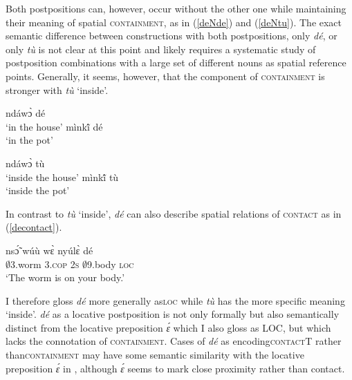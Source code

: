 Both postpositions can, however, occur without the other one while maintaining their meaning of spatial \textsc{containment}, as in (\ref{deNde}) and (\ref{deNtu}). The exact semantic difference between constructions with both postpositions, only {\itshape dé}, or only {\itshape tù} is not clear at this point and likely requires a systematic study of postposition combinations with a large set of different nouns as spatial reference points.  Generally, it seems, however, that the component of \textsc{containment} is stronger with {\itshape tù} `inside'.


\begin{minipage}{0.5\textwidth}
\begin{exe}
\ex\label{deNde}
\begin{xlist}
\ex ndáwɔ̀ dé \\ `in the house'
\ex mìnkĩ́ dé \\ `in the pot'
\end{xlist}
\end{exe}
\end{minipage}
\begin{minipage}{0.5\textwidth}
\begin{exe}
\ex\label{deNtu}
\begin{xlist}
\ex ndáwɔ̀ tù \\ `inside the house'
\ex mìnkĩ́ tù  \\ `inside the pot'
\end{xlist}
\end{exe}
\end{minipage}


In contrast to {\itshape tù} `inside', {\itshape dé} can also describe spatial relations of \textsc{contact} as in (\ref{decontact}).

\begin{exe}
\ex\label{decontact}
  \gll   nsɔ̃́ wúù wɛ̀ nyúlɛ̀ dé \\
           $\emptyset$3.worm 3.\textsc{cop} 2\textsc{s}   $\emptyset$9.body \textsc{loc}  \\
    \trans `The worm is on your body.'
\end {exe}

\noindent I therefore gloss {\itshape dé} more generally as\textsc{loc} while {\itshape tù} has the more specific meaning `inside'. {\itshape dé} as a locative postposition is not only formally but also semantically distinct from the locative preposition {\itshape ɛ́} which I also gloss as LOC, but which lacks the connotation of \textsc{containment}. Cases of {\itshape dé} as encoding\textsc{contact}T rather than\textsc{containment} may have some semantic similarity with the locative preposition {\itshape ɛ́} in , although {\itshape ɛ́} seems to mark close proximity rather than contact.

